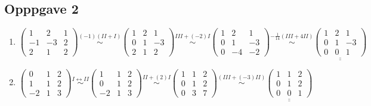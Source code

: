 \documentclass{article}
\newcommand{\uu}[1]{\underline{\underline{#1}}}
\newcommand{\eqto}[1]{\overset{#1}{\sim}}
\begin{document}
\subsection*{Opppgave 2}

\begin{enumerate}[A=]

    \item \( 
    \begin{pmatrix}
        1&2&1\\-1&-3&2\\2&1&2
    \end{pmatrix}
    \eqto{(-1)(II + I)}
    \begin{pmatrix}
        1 & 2 & 1 \\
        0 & 1 & -3 \\ 
        2 & 1 & 2
    \end{pmatrix}
    \eqto{III + (-2)I}
    \begin{pmatrix}
        1 & 2 & 1 \\
        0 & 1 & -3 \\
        0 & -4 & -2 
    \end{pmatrix}
    \eqto{ -\frac{1}{14}(III + 4II) }
    \uu{\begin{pmatrix}
        1 & 2 & 1 \\
        0 & 1 & -3 \\
        0 & 0 & 1
    \end{pmatrix}}
    \)
    
\vspace{3em}

    \item \(
    \begin{pmatrix}
        0&1&2\\1&1&2\\-2&1&3
    \end{pmatrix}
    \eqto{I\leftrightarrow II}
    \begin{pmatrix}
        1 & 1 & 2 \\
        0 & 1 & 2 \\
        -2 & 1 & 3
    \end{pmatrix}
    \eqto{II+(2)I}
    \begin{pmatrix}
        1 & 1 & 2 \\ 0 & 1 & 2 \\ 0 & 3 & 7
    \end{pmatrix}
    \eqto{(III+(-3)II)}
    \uu{\begin{pmatrix}
        1 & 1 & 2 \\ 0 & 1 & 2 \\ 0 & 0 & 1
    \end{pmatrix}}
    \)
    

\end{enumerate}
\end{document}
